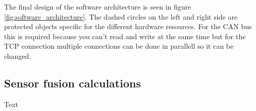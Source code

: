 The final design of the software architecture is seen in figure \ref{fig:software_architecture}.
The dashed circles on the left and right side are protected objects specific for
the different hardware resources. For the CAN bus this is required because you
can't read and write at the same time but for the TCP connection multiple connections
can be done in parallell so it can be changed.


\subsection{Sensor fusion calculations}
Text

%
